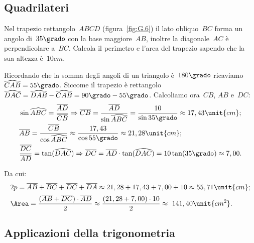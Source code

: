 
\subsection{Quadrilateri}
\label{subsec:trigo_quadrilatei}

 \begin{esempio}
Nel trapezio rettangolo~$ABCD$ (figura~\ref{fig:G.6}) il lato obliquo~$BC$ 
forma 
un angolo di~$35\grado$ con la base maggiore~$AB$, inoltre la diagonale~$AC$
è perpendicolare a~$BC$. Calcola il perimetro e l'area del trapezio sapendo che 
la sua altezza è~$10\unit{cm}$.

Ricordando che la somma degli angoli di un triangolo è~$180\grado$ 
ricaviamo~$\widehat{CAB}=55\grado$.
Siccome il trapezio è rettangolo
$\widehat{DAC}=\widehat{DAB}-\widehat{CAB}=90\grado-55\grado$.
Calcoliamo ora~$CB$, $AB$ e~$DC$:
\begin{align*}
&\sin \widehat{ABC} =\frac{\overline{AD}}{\overline{CB}} \Rightarrow 
\overline{CB}=\frac{\overline{AD}}{\sin \widehat{ABC}}=\frac{10}{\sin 35\grado
}\approx17,43\unit{cm};\\
&\overline{AB}=\frac{\overline{CB}}{\cos \widehat{ABC}}\approx\frac{17,43}{
\cos 55\grado}\approx21,28\unit{cm};\\
&\frac{\overline{DC}}{\overline{AD}}=\tan(\widehat{DAC}) \Rightarrow 
\overline{DC}=\overline{AD}\cdot\tan(\widehat{DAC})=10\tan(35\grado)\approx7,00.
\end{align*}


Da cui:
\begin{align*}
&2p=\overline{AB}+\overline{BC}+\overline{DC}+\overline{DA}\approx21,28+17,43+7,
00+10\approx55,71\unit{cm};\\
&\Area=\frac{(\overline{AB}+\overline{DC})\cdot\overline{AD}}{2}\approx\frac{(21
,28+7,00)\cdot 10}{2}\approx~141,40\unit{cm^2}.
\end{align*}
 \end{esempio}


\subsection{Applicazioni della trigonometria}
\label{subsec:trigo_applicazioni}

